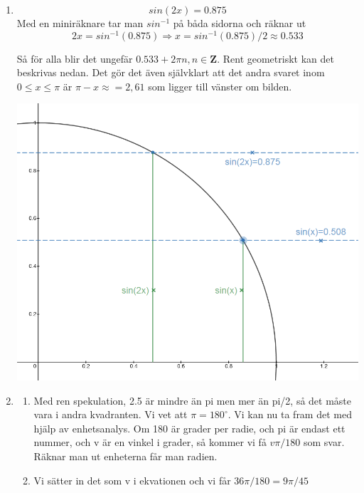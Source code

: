 \documentclass[a4paper,12pt]{article}
\begin{document}
\begin{enumerate}
      \item $$sin(2x)=0.875$$
            Med en miniräknare tar man $sin^{-1}$ på båda sidorna och räknar ut
            $$2x=sin^{-1}(0.875)\Rightarrow x=sin^{-1}(0.875)/2\approx 0.533$$

            Så för alla blir det ungefär $0.533+2\pi n, n\in \mathbf{Z}$.
            Rent geometriskt kan det beskrivas nedan.
            Det gör det även självklart
            att det andra svaret inom $0 \leq x \leq \pi$ är $\pi-x\approx=2,61$ som ligger till vänster om bilden.

            \includegraphics[scale=0.45]{Figur1.png}

      \item
            \begin{enumerate}
                  \item Med ren spekulation, 2.5 är mindre än pi men mer än pi/2, så det måste vara i andra kvadranten.
                        Vi vet att $\pi=180^\circ $. Vi kan nu ta fram det med
                        hjälp av enhetsanalys. Om 180 är grader per radie, och pi är endast ett nummer, och v är en vinkel
                        i grader, så kommer vi få $v\pi / 180$ som svar. Räknar man ut enheterna får man radien.

                  \item Vi sätter in det som v i ekvationen och vi får $36\pi / 180 = 9 \pi/ 45$
            \end{enumerate}


\end{enumerate}
\end{document}
